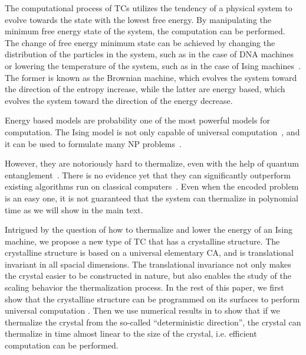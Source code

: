 \documentclass[twocolumn,superscriptaddress,english,showpacs,longbibliography]{revtex4-2}
\begin{document}
The computational process of TCs utilizes the tendency of a physical system to evolve towards the state with the lowest free energy.
By manipulating the minimum free energy state of the system, the computation can be performed.
The change of free energy minimum state can be achieved by changing the distribution of the particles in the system, such as in the case of DNA machines~\cite{Feynman2018} or lowering the temperature of the system, such as in the case of Ising machines~\cite{boixo2013experimental}.
The former is known as the Brownian machine, which evolves the system toward the direction of the entropy increase, while the latter are energy based, which evolves the system toward the direction of the energy decrease.

Energy based models are probability one of the most powerful models for computation.
The Ising model is not only capable of universal computation~\cite{gu2012encoding}, and it can be used to formulate many NP problems~\cite{lucas2014ising,mohseni2022ising}.

However, they are notoriously hard to thermalize, even with the help of quantum entanglement~\cite{boixo2013experimental, boixo2014evidence, Pichler2018, Ebadi2022, Nguyen2023}.
There is no evidence yet that they can significantly outperform existing algorithms run on classical computers~\cite{}.
Even when the encoded problem is an easy one, it is not guaranteed that the system can thermalize in polynomial time as we will show in the main text.

Intrigued by the question of how to thermalize and lower the energy of an Ising machine, we propose a new type of TC that has a crystalline structure.
The crystalline structure is based on a universal elementary CA, and is translational invariant in all spacial dimensions.
The translational invariance not only makes the crystal easier to be constructed in nature, but also enables the study of the scaling behavior the thermalization process.
In the rest of this paper, we first show that the crystalline structure can be programmed on its surfaces to perform universal computation .
Then we use numerical results in  to show that if we thermalize the crystal from the so-called ``deterministic direction'', the crystal can thermalize in time almost linear to the size of the crystal, i.e. efficient computation can be performed.

\end{document}
